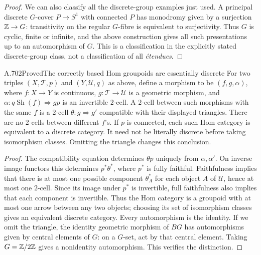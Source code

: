 \begin{proof}
We can also classify all the discrete-group examples just used.
A principal discrete $G$-cover $P\to S^1$ with connected $P$ has
monodromy given by a surjection $\mathbb Z\to G$: transitivity on the regular
$G$-fibre is equivalent to surjectivity. Thus $G$ is cyclic, finite or
infinite, and the above construction gives all such presentations up
to an automorphism of $G$. This is a classification in the explicitly
stated discrete-group class, not a classification of all \emph{\'etendues}.
\end{proof}

\begin{saresult}{A.702}{Proved}{The correctly based Hom groupoids are essentially discrete}
For two triples $(X,\mathcal T,p)$ and $(Y,\mathcal U,q)$ as above,
define a morphism to be $(f,g,\alpha)$, where $f:X\to Y$ is continuous,
$g:\mathcal T\to\mathcal U$ is a geometric morphism, and
$\alpha:q\operatorname{Sh}(f)\Rightarrow gp$ is an invertible
$2$-cell. A $2$-cell between such morphisms with the same $f$ is a
$2$-cell $\theta:g\Rightarrow g'$ compatible with their displayed
triangles. There are no $2$-cells between different $f$'s.
If $p$ is connected, each such Hom category is equivalent to a discrete
category. It need not be literally discrete before taking isomorphism
classes. Omitting the triangle changes this conclusion.
\end{saresult}
\begin{proof}
The compatibility equation determines $\theta p$ uniquely from
$\alpha,\alpha'$. On inverse image functors this determines
$p^*\theta^*$, where $p^*$ is fully faithful. Faithfulness implies
that there is at most one possible component $\theta_A^*$ for each
object $A$ of $\mathcal U$, hence at most one $2$-cell. Since its
image under $p^*$ is invertible, full faithfulness also implies that
each component is invertible. Thus the Hom category is a groupoid
with at most one arrow between any two objects; choosing its set of
isomorphism classes gives an equivalent discrete category. Every
automorphism is the identity. If we omit the triangle, the identity
geometric morphism of $BG$ has automorphisms given by central elements
of $G$: on a $G$-set, act by that central element. Taking $G=\mathbb Z/2\mathbb Z$
gives a nonidentity automorphism. This verifies the distinction.
\end{proof}

